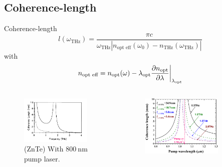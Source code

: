 \documentclass[aspectratio=1610, 9pt]{beamer}
\begin{document}
\subsection{Coherence-length}
\begin{frame}{Coherence-length}
\begin{equation}
    l(\omega_{\text{THz}}) = \frac{\pi c}{\omega_{\text{THz}} \left | n_\text{opt eff}(\omega_0) - n_{\text{THz}}(\omega_{\text{THz}})\right |}
\end{equation}
with 
\begin{equation}
    n_{\text{opt eff}} = n_\text{opt}(\omega) - \lambda_\text{opt}\frac{\partial n_\text{opt}}{\partial \lambda}\biggl{|}_{\lambda_\text{opt}}  
\end{equation}
\begin{center}
  \begin{columns}
    \begin{column}{.4\textwidth}
    \begin{figure}
      \includegraphics[width=0.9\textwidth]{images/coherence_length_ZnTe.png}
      \caption{(ZnTe) With $\SI{800}{\nano\meter}$ pump laser.}
    \end{figure}%
    \end{column}
    \begin{column}{.4\textwidth}
    \begin{figure}
      \includegraphics[width=0.8\textwidth]{images/GAP_coherencelength.png}

\end{figure}
\end{column}
\end{columns}
\end{center}
\end{frame}
\end{document}
